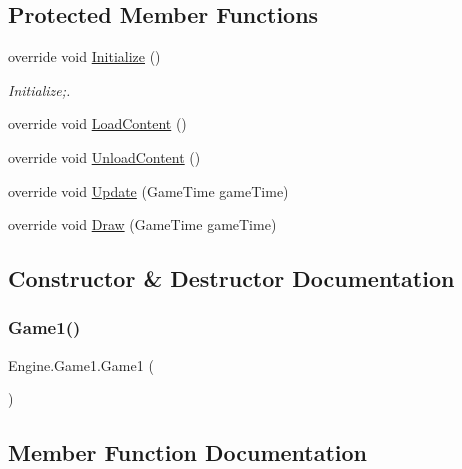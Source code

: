 \subsection*{Protected Member Functions}
\begin{DoxyCompactItemize}
\item 
override void \hyperlink{a00040_a640e4df5dfc3ea2b4dab155f3dc3152c}{Initialize} ()
\begin{DoxyCompactList}\small\item\em Initialize;. \end{DoxyCompactList}\item 
override void \hyperlink{a00040_a0c121f8c93986e79a1c402689f53d78e}{Load\+Content} ()
\item 
override void \hyperlink{a00040_a514f0c28029716a22b7e580a06fef9a0}{Unload\+Content} ()
\item 
override void \hyperlink{a00040_a5ec7bcee1272c1a62a77292cd95d043f}{Update} (Game\+Time game\+Time)
\item 
override void \hyperlink{a00040_a0d4254c27d581ec3a459cfc439a1a071}{Draw} (Game\+Time game\+Time)
\end{DoxyCompactItemize}


\subsection{Constructor \& Destructor Documentation}
\mbox{\label{a00040_a321d836485b0e6ba049e1200dee17c3b}} 
\subsubsection{\texorpdfstring{Game1()}{Game1()}}
{\footnotesize\ttfamily Engine.\+Game1.\+Game1 (\begin{DoxyParamCaption}{ }\end{DoxyParamCaption})\hspace{0.3cm}{\ttfamily [inline]}}



\subsection{Member Function Documentation}
\mbox{\label{a00040_a0d4254c27d581ec3a459cfc439a1a071}} 

